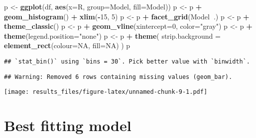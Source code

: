 \documentclass[]{article}
\newenvironment{Shaded}{\begin{snugshade}}{\end{snugshade}}
\newcommand{\DataTypeTok}[1]{\textcolor[rgb]{0.13,0.29,0.53}{#1}}
\newcommand{\DecValTok}[1]{\textcolor[rgb]{0.00,0.00,0.81}{#1}}
\newcommand{\KeywordTok}[1]{\textcolor[rgb]{0.13,0.29,0.53}{\textbf{#1}}}
\newcommand{\NormalTok}[1]{#1}
\newcommand{\OperatorTok}[1]{\textcolor[rgb]{0.81,0.36,0.00}{\textbf{#1}}}
\newcommand{\OtherTok}[1]{\textcolor[rgb]{0.56,0.35,0.01}{#1}}
\newcommand{\StringTok}[1]{\textcolor[rgb]{0.31,0.60,0.02}{#1}}
\begin{document}
\begin{Shaded}
\begin{Highlighting}[]
\NormalTok{p <-}\StringTok{ }\KeywordTok{ggplot}\NormalTok{(df, }\KeywordTok{aes}\NormalTok{(}\DataTypeTok{x=}\NormalTok{R, }\DataTypeTok{group=}\NormalTok{Model, }\DataTypeTok{fill=}\NormalTok{Model))}
\NormalTok{p <-}\StringTok{ }\NormalTok{p }\OperatorTok{+}\StringTok{ }\KeywordTok{geom_histogram}\NormalTok{() }\OperatorTok{+}\StringTok{ }\KeywordTok{xlim}\NormalTok{(}\OperatorTok{-}\DecValTok{15}\NormalTok{, }\DecValTok{5}\NormalTok{)}
\NormalTok{p <-}\StringTok{ }\NormalTok{p }\OperatorTok{+}\StringTok{ }\KeywordTok{facet_grid}\NormalTok{(Model}\OperatorTok{~}\NormalTok{.)}
\NormalTok{p <-}\StringTok{ }\NormalTok{p }\OperatorTok{+}\StringTok{ }\KeywordTok{theme_classic}\NormalTok{()}
\NormalTok{p <-}\StringTok{ }\NormalTok{p }\OperatorTok{+}\StringTok{ }\KeywordTok{geom_vline}\NormalTok{(}\DataTypeTok{xintercept=}\DecValTok{0}\NormalTok{, }\DataTypeTok{color=}\StringTok{"gray"}\NormalTok{)}
\NormalTok{p <-}\StringTok{ }\NormalTok{p }\OperatorTok{+}\StringTok{ }\KeywordTok{theme}\NormalTok{(}\DataTypeTok{legend.position=}\StringTok{"none"}\NormalTok{)}
\NormalTok{p <-}\StringTok{ }\NormalTok{p }\OperatorTok{+}\StringTok{ }\KeywordTok{theme}\NormalTok{(}
      \DataTypeTok{strip.background =} \KeywordTok{element_rect}\NormalTok{(}\DataTypeTok{colour=}\OtherTok{NA}\NormalTok{, }\DataTypeTok{fill=}\OtherTok{NA}\NormalTok{)}
\NormalTok{)}
\NormalTok{p}
\end{Highlighting}
\end{Shaded}

\begin{verbatim}
## `stat_bin()` using `bins = 30`. Pick better value with `binwidth`.
\end{verbatim}

\begin{verbatim}
## Warning: Removed 6 rows containing missing values (geom_bar).
\end{verbatim}

\texttt{[image: results\_files/figure-latex/unnamed-chunk-9-1.pdf]}

\hypertarget{best-fitting-model}{%
\section{Best fitting model}\label{best-fitting-model}}
\end{document}
